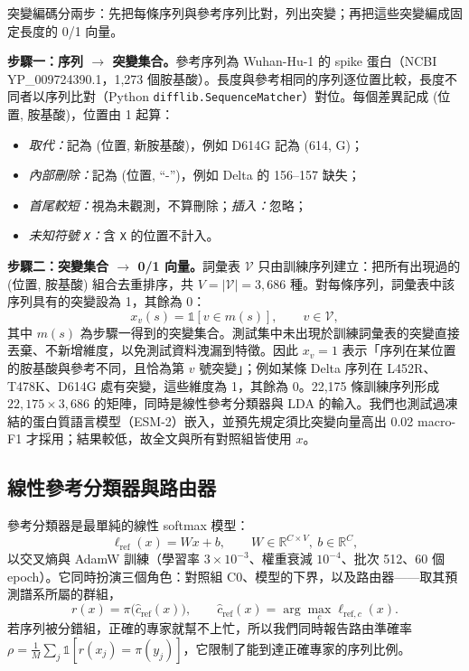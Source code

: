 \documentclass[10pt,a4paper]{article}
\begin{document}
突變編碼分兩步：先把每條序列與參考序列比對，列出突變；再把這些突變編成固定長度的 0/1 向量。

\textbf{步驟一：序列 $\to$ 突變集合。}參考序列為 Wuhan-Hu-1 的 spike 蛋白（NCBI YP\_009724390.1，1,273 個胺基酸）。長度與參考相同的序列逐位置比較，長度不同者以序列比對（Python \texttt{difflib.SequenceMatcher}）對位。每個差異記成 (位置, 胺基酸)，位置由 1 起算：
\begin{itemize}[nosep]
    \item \emph{取代：}記為 (位置, 新胺基酸)，例如 D614G 記為 (614, G)；
    \item \emph{內部刪除：}記為 (位置, ``-'')，例如 Delta 的 156--157 缺失；
    \item \emph{首尾較短：}視為未觀測，不算刪除；\emph{插入：}忽略；
    \item \emph{未知符號 \texttt{X}：}含 \texttt{X} 的位置不計入。
\end{itemize}

\textbf{步驟二：突變集合 $\to$ 0/1 向量。}詞彙表 $\mathcal{V}$ 只由訓練序列建立：把所有出現過的 (位置, 胺基酸) 組合去重排序，共 $V=|\mathcal{V}|=3{,}686$ 種。對每條序列，詞彙表中該序列具有的突變設為 1，其餘為 0：
\begin{equation}
    x_v(s)=\mathbb{1}[v\in m(s)],\qquad v\in\mathcal{V},
    \label{eq:mutation}
\end{equation}
其中 $m(s)$ 為步驟一得到的突變集合。測試集中未出現於訓練詞彙表的突變直接丟棄、不新增維度，以免測試資料洩漏到特徵。因此 $x_v=1$ 表示「序列在某位置的胺基酸與參考不同，且恰為第 $v$ 號突變」；例如某條 Delta 序列在 L452R、T478K、D614G 處有突變，這些維度為 1，其餘為 0。22,175 條訓練序列形成 $22{,}175\times3{,}686$ 的矩陣，同時是線性參考分類器與 LDA 的輸入。我們也測試過凍結的蛋白質語言模型（ESM-2）嵌入，並預先規定須比突變向量高出 0.02 macro-F1 才採用；結果較低，故全文與所有對照組皆使用 $x$。

\subsection{線性參考分類器與路由器}
\label{sec:router}

參考分類器是最單純的線性 softmax 模型：
\begin{equation}
    \ell_{\mathrm{ref}}(x)=Wx+b,\qquad W\in\mathbb{R}^{C\times V},\ b\in\mathbb{R}^{C},
    \label{eq:reference}
\end{equation}
以交叉熵與 AdamW 訓練（學習率 $3\times10^{-3}$、權重衰減 $10^{-4}$、批次 512、60 個 epoch）。它同時扮演三個角色：對照組 C0、模型的下界，以及路由器——取其預測譜系所屬的群組，
\begin{equation}
    r(x)=\pi\big(\hat{c}_{\mathrm{ref}}(x)\big),\qquad \hat{c}_{\mathrm{ref}}(x)=\arg\max_{c}\ell_{\mathrm{ref},c}(x).
    \label{eq:router}
\end{equation}
若序列被分錯組，正確的專家就幫不上忙，所以我們同時報告路由準確率 $\rho=\frac1M\sum_j\mathbb{1}[r(x_j)=\pi(y_j)]$，它限制了能到達正確專家的序列比例。
\end{document}
